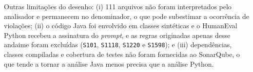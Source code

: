 Outras limitações do desenho: (i) 111 arquivos não foram interpretados pelo analisador e permanecem no denominador, o que pode subestimar a ocorrência de violações; (ii) o código Java foi envolvido em classes sintéticas e o HumanEval Python recebeu a assinatura do \textit{prompt}, e as regras originadas apenas desse andaime foram excluídas (\texttt{S101}, \texttt{S1118}, \texttt{S1220} e \texttt{S1598}); e (iii) dependências, classes compiladas e cobertura de testes não foram fornecidas ao SonarQube, o que tende a tornar a análise Java menos precisa que a análise Python.